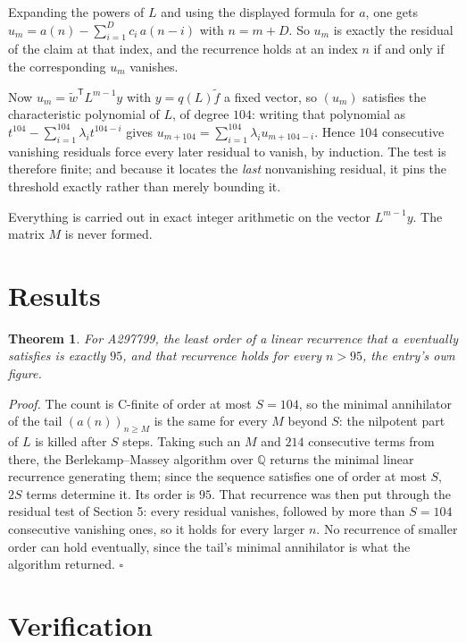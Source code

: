 \documentclass[11pt]{article}
\newtheorem{theorem}{Theorem}
\theoremstyle{definition}
\begin{document}
Expanding the powers of $L$ and using the displayed formula for $a$, one gets $u_m = a(n) - \sum_{i=1}^{D} c_i\,a(n-i)$ with $n = m + D$. So $u_m$ is exactly the residual of the claim at that index, and the recurrence holds at an index $n$ if and only if the corresponding $u_m$ vanishes.

Now $u_m = \tilde w^{\mathsf T} L^{m-1} y$ with $y = q(L)\tilde f$ a fixed vector, so $(u_m)$ satisfies the characteristic polynomial of $L$, of degree $104$: writing that polynomial as $t^{104} - \sum_{i=1}^{104} \lambda_i t^{104-i}$ gives $u_{m+104} = \sum_{i=1}^{104} \lambda_i u_{m+104-i}$. Hence $104$ consecutive vanishing residuals force every later residual to vanish, by induction. The test is therefore finite; and because it locates the {\itshape last} nonvanishing residual, it pins the threshold exactly rather than merely bounding it.

Everything is carried out in exact integer arithmetic on the vector $L^{m-1}y$. The matrix $M$ is never formed.

\section{Results}

\begin{theorem} For A297799, the least order of a linear recurrence that $a$ eventually satisfies is exactly $95$, and that recurrence holds for every $n > 95$, the entry's own figure.\end{theorem}

{\itshape Proof.} The count is C-finite of order at most $S = 104$, so the minimal annihilator of the tail $(a(n))_{n \ge M}$ is the same for every $M$ beyond $S$: the nilpotent part of $L$ is killed after $S$ steps. Taking such an $M$ and $214$ consecutive terms from there, the Berlekamp--Massey algorithm over $\mathbb{Q}$ returns the minimal linear recurrence generating them; since the sequence satisfies one of order at most $S$, $2S$ terms determine it. Its order is $95$. That recurrence was then put through the residual test of Section 5: every residual vanishes, followed by more than $S = 104$ consecutive vanishing ones, so it holds for every larger $n$. No recurrence of smaller order can hold eventually, since the tail's minimal annihilator is what the algorithm returned. $\square$

\section{Verification}
\end{document}
